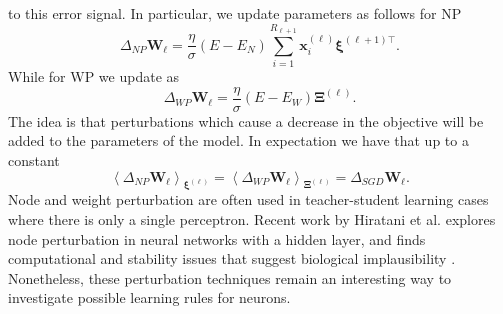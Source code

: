 \documentclass{article}
\def\*#1{\mathbf{#1}}
\begin{document}
to this error signal. In particular, we update parameters as follows for NP
\[ \Delta_{NP} \*W_{\ell} =\frac{\eta}{\sigma} (E-E_N) \sum_{i=1}^{R_{\ell+1}} \*x^{(\ell)}_i \* \xi^{(\ell+1)\top}. \]
While for WP we update as
\[ \Delta_{WP} \*W_{\ell} = \frac{\eta}{\sigma} (E-E_W) \* \Xi^{(\ell)} .\]
 The idea is that perturbations which cause a decrease in the objective will be added to 
 the parameters of the model. In expectation we have that up to a constant
\[ \left\langle \Delta_{NP}\*W_{\ell} \right\rangle_{\*\xi^{(\ell)}}= \left\langle \Delta_{WP}\*W_{\ell} \right\rangle_{\*\Xi^{(\ell)}} =  \Delta_{SGD}\*W_{\ell}.\]
Node and weight perturbation are often used in teacher-student learning cases 
where there is only a single perceptron. Recent work by Hiratani et al. explores node perturbation
in neural networks with a hidden layer, and finds computational and stability issues that
suggest biological implausibility \cite{hiratani2022on}. Nonetheless, these perturbation techniques remain an interesting way
to investigate possible learning rules for neurons. 
\end{document}
